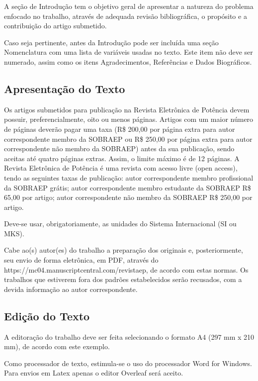 \documentclass[portugues]{sobraep}
\begin{document}
A seção de Introdução tem o objetivo geral de apresentar a natureza do problema enfocado no trabalho, através de adequada revisão bibliográfica, o propósito e a contribuição do artigo submetido.

Caso seja pertinente, antes da Introdução pode ser incluída uma seção Nomenclatura com uma lista de variáveis usadas no texto. Este item não deve ser numerado, assim como os itens Agradecimentos, Referências e Dados Biográficos.

\subsection{Apresentação do Texto}

Os artigos submetidos para publicação na Revista Eletrônica de Potência devem possuir, preferencialmente, oito ou menos páginas. Artigos com um maior número de páginas deverão pagar uma taxa (R\$ 200,00 por página extra para autor correspondente membro da SOBRAEP ou R\$ 250,00 por página extra para autor correspondente não membro da SOBRAEP) antes da sua publicação, sendo aceitas até quatro páginas extras. Assim, o limite máximo é de 12 páginas.
A Revista Eletrônica de Potência é uma revista com acesso livre (open access), tendo as seguintes taxas de publicação: autor correspondente membro profissional da SOBRAEP grátis; autor correspondente membro estudante da SOBRAEP R\$ 65,00 por artigo; autor correspondente não membro da SOBRAEP R\$ 250,00 por artigo.

Deve-se usar, obrigatoriamente, as unidades do Sistema Internacional (SI ou MKS).

Cabe ao(s) autor(es) do trabalho a preparação dos originais e, posteriormente, seu envio de forma eletrônica, em PDF, através do https://mc04.manuscriptcentral.com/revistaep, de acordo com estas normas. Os trabalhos que estiverem fora dos padrões estabelecidos serão recusados, com a devida informação ao autor correspondente.

\subsection{Edição do Texto}

A editoração do trabalho deve ser feita selecionando o formato A4 (297 mm x 210 mm), de acordo com este exemplo.

Como processador de texto, estimula-se o uso do processador Word for Windows. Para envios em Latex apenas o editor Overleaf será aceito.
\end{document}
